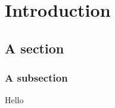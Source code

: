 

\chapter{Introduction}
\label{chap:introduction}
\section{A section}
\subsection{A subsection}
Hello